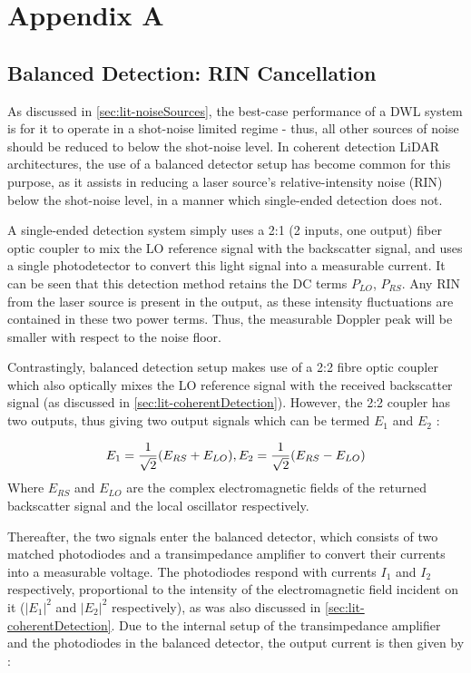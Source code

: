 \chapter{Appendix A}
\section{Balanced Detection: RIN Cancellation}
\label{appendix:RIN}
As discussed  in \autoref{sec:lit-noiseSources}, the best-case performance of a DWL system is for it to operate in a shot-noise limited regime - thus, all other sources of noise should be reduced to below the shot-noise level. In coherent detection LiDAR architectures, the use of a balanced detector setup has become common for this purpose, as it assists in reducing a laser source's relative-intensity noise (RIN) below the shot-noise level, in a manner which single-ended detection does not. 

A single-ended detection system simply uses a 2:1 (2 inputs, one output) fiber optic coupler to mix the LO reference signal with the backscatter signal, and uses a single photodetector to convert this light signal into a measurable current. It can be seen that this detection method retains the DC terms $P_{LO}$, $P_{RS}$. Any RIN from the laser source is present in the output, as these intensity fluctuations are contained in these two power terms. Thus, the measurable Doppler peak will be smaller with respect to the noise floor. 

Contrastingly, balanced detection setup makes use of a 2:2 fibre optic coupler which also optically mixes the LO reference signal with the received backscatter signal (as discussed in \autoref{sec:lit-coherentDetection}). However, the 2:2 coupler has two outputs, thus giving two output signals which can be termed $E_1$ and $E_2$ \cite{kikuchi_fundamentals_2016}:

\begin{equation}
	E_1 = \frac{1}{\sqrt2}(E_{RS} + E_{LO}), \space 
	E_2 = \frac{1}{\sqrt{2}}(E_{RS} - E_{LO})
\end{equation}
Where $E_{RS}$ and $E_{LO}$ are the complex electromagnetic fields of the returned backscatter signal and the local oscillator respectively. 

Thereafter, the two signals enter the balanced detector, which consists of two matched photodiodes and a transimpedance amplifier to convert their currents into a measurable voltage. The photodiodes respond with currents $I_1$ and $I_2$ respectively, proportional to the intensity of the electromagnetic field incident on it ($|E_{1}|^2$ and $|E_2|^2$ respectively), as was also discussed in \autoref{sec:lit-coherentDetection}. Due to the internal setup of the transimpedance amplifier and the photodiodes in the balanced detector, the output current is then given by \cite{kikuchi_fundamentals_2016}:

